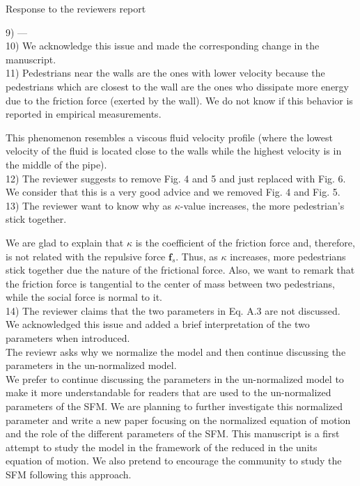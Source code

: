 \documentclass[a4paper,12pt]{letter}
\begin{document}
\begin{letter}{Response to the reviewers report}
{9) --- \\

10) We acknowledge this issue and made the corresponding change in the 
manuscript.\\

11) Pedestrians near the walls are the ones with lower velocity because the pedestrians which are closest to the wall are the ones who dissipate more energy due to the friction force (exerted by the wall). We do not know if this behavior is reported in empirical measurements.  

This phenomenon resembles a viscous fluid velocity profile (where the lowest velocity of the fluid is located close to the walls while the highest velocity is in the middle of the pipe).  \\

12) The reviewer suggests to remove Fig. 4 and 5 and just replaced with Fig. 6. We consider that this is a very good advice and we removed Fig. 4 and Fig. 5.  \\

13) The reviewer want to know why as $\kappa$-value increases, the more 
pedestrian's stick together.

We are glad to explain that $\kappa$ is the coefficient of the 
friction force and, therefore, is not related with the repulsive force 
$\mathbf{f}_s$. Thus, as $\kappa$ increases, more pedestrians stick 
together due the nature of the frictional force. Also, we want to remark that 
the friction force is tangential to the center of mass between two pedestrians, 
while the social force is normal to it. \\

14) The reviewer claims that the two parameters in Eq. A.3 are not discussed.
We acknowledged this issue and added a brief interpretation of the two parameters when introduced.\\

The reviewr asks why we normalize the model and then continue discussing the parameters in the un-normalized model.\\

We prefer to continue discussing the parameters in the un-normalized model to make it more understandable for readers that are used to the un-normalized parameters of the SFM. We are planning to further investigate this normalized parameter and write a new paper focusing on the normalized equation of motion and the role of the different parameters of the SFM. This manuscript is a first attempt to study the model in the framework of the reduced in the units equation of motion. We also pretend to encourage the community to study the SFM following this approach.


}
\end{letter}
\end{document}
